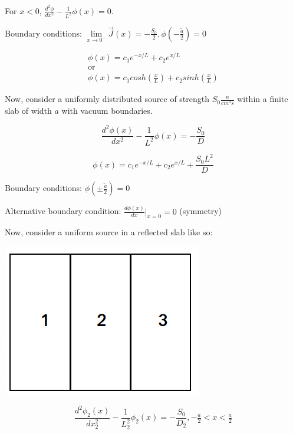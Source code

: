 \documentclass[12pt]{article}
\begin{document}
For $x < 0$, $\frac{d^2\phi}{dx^2} - \frac{1}{L^2}\phi(x) = 0$.

Boundary conditions: 
$\lim\limits_{x\rightarrow 0^-}\vec{J}(x) = -\frac{S_0}{2}, \phi(-\tfrac{\tilde{a}}{2}) = 0$

\begin{gather*}
\phi(x) = c_1e^{-x/L} + c_2e^{x/L} \\
\text{or} \\
\phi(x) = c_1cosh(\tfrac{x}{L}) + c_2sinh(\tfrac{x}{L})
\end{gather*}


Now, consider a uniformly distributed source of strength $S_0 \tfrac{n}{cm^3s}$ within a finite slab of
width $a$ with vacuum boundaries.

\begin{equation*}
\frac{d^2\phi(x)}{dx^2} - \frac{1}{L^2}\phi(x) = -\frac{S_0}{D}
\end{equation*}

\begin{equation*}
\phi(x) = c_1e^{-x/L} + c_2e^{x/L} + \frac{S_0L^2}{D}
\end{equation*}

Boundary conditions: $\phi(\pm\tfrac{\tilde{a}}{2}) = 0$


Alternative boundary condition: $\frac{d\phi(x)}{dx}\Bigr|_{x = 0} = 0$ (symmetry)


Now, consider a uniform source in a reflected slab like so:

\begin{center}
\includegraphics[height=2.5 in]{../figs/ref_slab}
\end{center}

\begin{equation*}
\frac{d^2\phi_2(x)}{dx_2^2} - \frac{1}{L_2^2}\phi_2(x) = -\frac{S_0}{D_2}, -\tfrac{a}{2}<x<\tfrac{a}{2}
\end{equation*}
\end{document}
